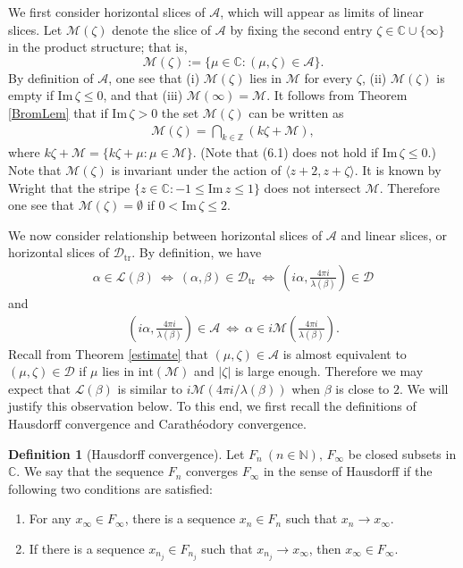\documentclass[12pt]{article}
\theoremstyle{plain}
\theoremstyle{definition}
\newtheorem{defn}[thm]{Definition}
\theoremstyle{remark}
\newcommand{\C}{\mathbb C}
\newcommand{\Z}{\mathbb Z}
\newcommand{\N}{\mathbb N}
\newcommand{\D}{\mathcal D}
\newcommand{\M}{\mathcal M}
\newcommand{\LL}{\mathcal L}
\newcommand{\A}{\mathcal A}
\newcommand{\lam}{\lambda}
\newcommand{\alp}{\alpha}
\newcommand{\fty}{\infty}
\newcommand{\la}{\langle}
\newcommand{\ra}{\rangle}
\newcommand{\ze}{\zeta}
\newcommand{\tr}{{\mathrm{tr}}}
\newcommand{\inte}{\mathrm{int}}
\newcommand{\im}{\mathrm{Im}}
\begin{document}
We first consider horizontal slices of $\A$, which will appear as limits of linear slices. 
Let  $\M(\zeta)$ denote the slice of $\A$ by fixing the second entry 
$\zeta \in \C \cup \{\fty\}$ 
in the product structure; that is, 
$$
\M(\ze):=\{\mu \in \C : (\mu,\zeta) \in \A\}. 
$$
By definition of $\A$, one see that (i) $\M(\ze)$ lies in $\M$ for every $\ze$, 
(ii) $\M(\ze)$ is empty  if $\im\,\ze \le 0$, and that  (iii) $\M(\fty)=\M$. 
It follows from Theorem \ref{BromLem} that  if  $\im\,\ze>0$ the set $\M(\ze)$ can be written as 
\begin{eqnarray}
\M(\zeta)= \bigcap_{k \in \Z}(k\zeta+\M),
\end{eqnarray}
where $k\ze+\M=\{k\ze+\mu : \mu \in \M\}$. 
(Note that (6.1) does not hold if $\im\,\ze \le 0$.) 
Note that  $\M(\ze)$ is invariant under the action of $\la z+2,z+\ze \ra$. 
It is known by Wright \cite{Wr} that the stripe $\{z \in \C : -1 \le \im\,z \le 1\}$ does not intersect $\M$. 
Therefore one see that $\M(\ze)=\emptyset$ if $0<\im\,\ze \le2$. 

We now consider relationship between  horizontal slices of $\A$ and linear slices, or horizontal slices of $\D_\tr$. 
By definition, we have 
%
\begin{eqnarray*}
\alp \in \LL(\beta) \ \iff \  (\alp,\beta) \in \D_\tr \ \iff \   
\left(i\alp,\frac{4\pi i}{\lam(\beta)}\right) \in  \D 
\end{eqnarray*}
and 
\begin{eqnarray*}
   \left(i\alp,\frac{4\pi i}{\lam(\beta)}\right) \in \A \ 
    \iff \ \alpha \in i  \M\left(\frac{4\pi i}{\lam(\beta)}\right). 
\end{eqnarray*}
%
Recall from Theorem \ref{estimate} that 
$(\mu,\ze) \in \A$ is almost equivalent to  $(\mu,\ze) \in \D$ 
if  $\mu$ lies in $\inte(\M)$ and $|\ze|$ is large enough. 
Therefore we may expect that $\LL(\beta)$ is similar to $i\M({4\pi i/\lam(\beta)})$ 
when $\beta$ is close to $2$.  
We will justify this observation below. 
To this end, we first recall the definitions of Hausdorff convergence and Carath\'{e}odory  convergence. 

\begin{defn}[Hausdorff convergence]
Let 
$F_n \ (n \in \N),\,F_\fty$ be closed subsets in $\C$.  
We say that the sequence $F_n$ converges $F_\fty$ in the sense of Hausdorff 
if the following two conditions are satisfied: 
\begin{enumerate}
\item For any $x_\fty \in F_\fty$, there is a sequence $x_n \in F_n$ 
such that $x_n \to x_\fty$. 
\item If there is a sequence 
$x_{n_j} \in F_{n_j}$ such that $x_{n_j} \to x_\fty$, then  $x_\fty \in F_\fty$. 
\end{enumerate}
\end{defn}
\end{document}
